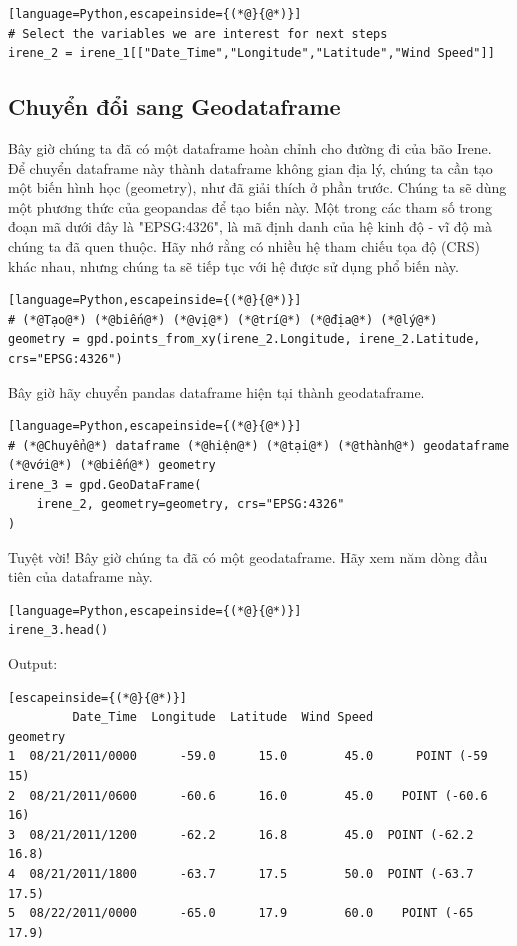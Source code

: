 \begin{lstlisting}[language=Python,escapeinside={(*@}{@*)}]
# Select the variables we are interest for next steps
irene_2 = irene_1[["Date_Time","Longitude","Latitude","Wind Speed"]]
\end{lstlisting}

\subsection{Chuyển đổi sang Geodataframe}

Bây giờ chúng ta đã có một dataframe hoàn chỉnh cho đường đi của bão Irene. Để chuyển dataframe này thành dataframe không gian địa lý, chúng ta cần tạo một biến hình học (geometry), như đã giải thích ở phần trước. Chúng ta sẽ dùng một phương thức của geopandas để tạo biến này. Một trong các tham số trong đoạn mã dưới đây là "EPSG:4326", là mã định danh của hệ kinh độ - vĩ độ mà chúng ta đã quen thuộc. Hãy nhớ rằng có nhiều hệ tham chiếu tọa độ (CRS) khác nhau, nhưng chúng ta sẽ tiếp tục với hệ được sử dụng phổ biến này.

\begin{lstlisting}[language=Python,escapeinside={(*@}{@*)}]
# (*@Tạo@*) (*@biến@*) (*@vị@*) (*@trí@*) (*@địa@*) (*@lý@*)
geometry = gpd.points_from_xy(irene_2.Longitude, irene_2.Latitude, crs="EPSG:4326")
\end{lstlisting}

Bây giờ hãy chuyển pandas dataframe hiện tại thành geodataframe.

\begin{lstlisting}[language=Python,escapeinside={(*@}{@*)}]
# (*@Chuyển@*) dataframe (*@hiện@*) (*@tại@*) (*@thành@*) geodataframe (*@với@*) (*@biến@*) geometry
irene_3 = gpd.GeoDataFrame(
    irene_2, geometry=geometry, crs="EPSG:4326"
)
\end{lstlisting}

Tuyệt vời! Bây giờ chúng ta đã có một geodataframe. Hãy xem năm dòng đầu tiên của dataframe này.

\begin{lstlisting}[language=Python,escapeinside={(*@}{@*)}]
irene_3.head()
\end{lstlisting}

Output:

\begin{lstlisting}[escapeinside={(*@}{@*)}]
         Date_Time  Longitude  Latitude  Wind Speed            geometry
1  08/21/2011/0000      -59.0      15.0        45.0      POINT (-59 15)
2  08/21/2011/0600      -60.6      16.0        45.0    POINT (-60.6 16)
3  08/21/2011/1200      -62.2      16.8        45.0  POINT (-62.2 16.8)
4  08/21/2011/1800      -63.7      17.5        50.0  POINT (-63.7 17.5)
5  08/22/2011/0000      -65.0      17.9        60.0    POINT (-65 17.9)
\end{lstlisting}

